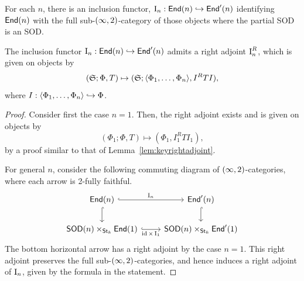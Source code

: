 For each $n$, there is an inclusion functor, $\operatorname{I}_n:\mathsf{End}(n) \hookrightarrow \mathsf{End}'(n)$ identifying $\mathsf{End}(n)$ with the full sub-$(\infty,2)$-category of those objects where the partial SOD is an SOD.

\begin{lem}\label{lem:rightadjointend}
    The inclusion functor $\operatorname{I}_n:\mathsf{End}(n) \hookrightarrow \mathsf{End}'(n)$ admits a right adjoint $\operatorname{I}_n^R$, which is given on objects by
    \[(\mathfrak{S};\Phi,T)\mapsto (\mathfrak{S};\langle\Phi_1,\dots,\Phi_n\rangle,I^RTI),\]
    where $I:\langle\Phi_1,\dots,\Phi_n\rangle\hookrightarrow \Phi$.
\end{lem}

\begin{proof}
    Consider first the case $n=1$. Then, the right adjoint exists and is given on objects by
    \[(\Phi_1;\Phi,T)\mapsto (\Phi_1,I_1^RTI_1),\]
    by a proof similar to that of Lemma~\ref{lem:keyrightadjoint}.

    For general $n$, consider the following commuting diagram of $(\infty,2)$-categories, where each arrow is 2-fully faithful.
    \[\begin{tikzcd}[ampersand replacement=\&]
        {\sfEnd(n)} \& {\sfEnd'(n)} \\
        {\sfSOD(n)\times_{\sfSt_k}\sfEnd(1)} \& {\sfSOD(n)\times_{\sfSt_k}\sfEnd'(1)}
        \arrow["{\opname{I}_n}", hook, from=1-1, to=1-2]
        \arrow[hook, from=1-1, to=2-1]
        \arrow[hook, from=1-2, to=2-2]
        \arrow["{\id\times\opname{I_1}}"', hook, from=2-1, to=2-2]
    \end{tikzcd}\]
    The bottom horizontal arrow has a right adjoint by the case $n=1$. This right adjoint preserves the full sub-$(\infty,2)$-categories, and hence induces a right adjoint of $\operatorname{I}_n$, given by the formula in the statement.
\end{proof}

